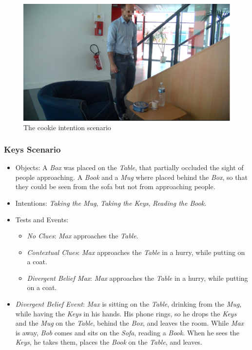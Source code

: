  \begin{figure}[ht!]
	\centering
	\includegraphics[scale=0.5]{img/situation_assessment/cookie1-blur.pdf}
	\caption{The cookie intention scenario}
	\label{fig:situation_assessment-cookie}
\end{figure}


\subsubsection{Keys Scenario}
\begin{itemize}
\item Objects: A \textit{Box} was placed on the \textit{Table}, that partially occluded the sight of people approaching. A \textit{Book} and a \textit{Mug} where placed behind the \textit{Box}, so that they could be seen from the sofa but not from approaching people.
\item Intentions: \textit{Taking the Mug}, \textit{Taking the Keys}, \textit{Reading the Book}.
\item Tests and Events:
\begin{itemize}
\item \textit{No Clues}: \textit{Max} approaches the \textit{Table}.
\item\textit{Contextual Clues}: \textit{Max} approaches the \textit{Table} in a hurry, while putting on a coat.
\item \textit{Divergent Belief Max}: \textit{Max} approaches the \textit{Table} in a hurry, while putting on a coat.
\end{itemize}
\item \textit{Divergent Belief Event}: \textit{Max} is sitting on the \textit{Table}, drinking from the \textit{Mug}, while having the \textit{Keys} in his hands. His phone rings, so he drops the \textit{Keys} and the \textit{Mug} on the \textit{Table}, behind the \textit{Box}, and leaves the room. While \textit{Max} is away, \textit{Bob} comes and sits on the \textit{Sofa}, reading a \textit{Book}. When he sees the \textit{Keys}, he takes them, places the \textit{Book} on the \textit{Table}, and leaves.
\end{itemize}

